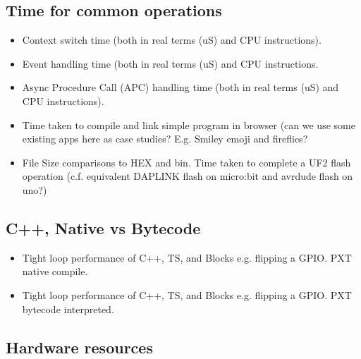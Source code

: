 \subsection{Time for common \CO operations}

\begin{itemize}
\item Context switch time (both in real terms (uS) and CPU instructions). 
\item Event handling time (both in real terms (uS) and CPU instructions. 
\item Async Procedure Call (APC) handling time (both in real terms (uS) and CPU instructions). 
\end{itemize}





\begin{itemize}
\item Time taken to compile and link simple program in browser (can we use some existing apps 
      here as case studies? E.g. Smiley emoji and fireflies?
\item \UF File Size comparisons to HEX and bin. Time taken to complete a UF2 flash operation 
    (c.f. equivalent DAPLINK flash on micro:bit and avrdude flash on uno?)
\end{itemize}

\subsection{C++, Native vs Bytecode}
\begin{itemize}
\item Tight loop performance of C++, TS, and Blocks e.g. flipping a GPIO. PXT native compile.
\item Tight loop performance of C++, TS, and Blocks e.g. flipping a GPIO. PXT bytecode interpreted.
\end{itemize}

\subsection{Hardware resources}



